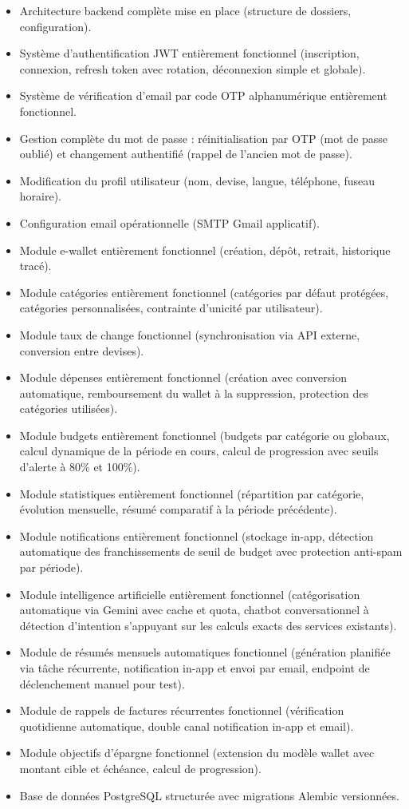 \documentclass[11pt,a4paper]{article}
\begin{document}
\begin{itemize}[leftmargin=*]
    \item Architecture backend complète mise en place (structure de dossiers, configuration).
    \item Système d'authentification JWT entièrement fonctionnel (inscription, connexion, refresh token avec rotation, déconnexion simple et globale).
    \item Système de vérification d'email par code OTP alphanumérique entièrement fonctionnel.
    \item Gestion complète du mot de passe : réinitialisation par OTP (mot de passe oublié) et changement authentifié (rappel de l'ancien mot de passe).
    \item Modification du profil utilisateur (nom, devise, langue, téléphone, fuseau horaire).
    \item Configuration email opérationnelle (SMTP Gmail applicatif).
    \item Module e-wallet entièrement fonctionnel (création, dépôt, retrait, historique tracé).
    \item Module catégories entièrement fonctionnel (catégories par défaut protégées, catégories personnalisées, contrainte d'unicité par utilisateur).
    \item Module taux de change fonctionnel (synchronisation via API externe, conversion entre devises).
    \item Module dépenses entièrement fonctionnel (création avec conversion automatique, remboursement du wallet à la suppression, protection des catégories utilisées).
    \item Module budgets entièrement fonctionnel (budgets par catégorie ou globaux, calcul dynamique de la période en cours, calcul de progression avec seuils d'alerte à 80\% et 100\%).
    \item Module statistiques entièrement fonctionnel (répartition par catégorie, évolution mensuelle, résumé comparatif à la période précédente).
    \item Module notifications entièrement fonctionnel (stockage in-app, détection automatique des franchissements de seuil de budget avec protection anti-spam par période).
    \item Module intelligence artificielle entièrement fonctionnel (catégorisation automatique via Gemini avec cache et quota, chatbot conversationnel à détection d'intention s'appuyant sur les calculs exacts des services existants).
    \item Module de résumés mensuels automatiques fonctionnel (génération planifiée via tâche récurrente, notification in-app et envoi par email, endpoint de déclenchement manuel pour test).
    \item Module de rappels de factures récurrentes fonctionnel (vérification quotidienne automatique, double canal notification in-app et email).
    \item Module objectifs d'épargne fonctionnel (extension du modèle wallet avec montant cible et échéance, calcul de progression).
    \item Base de données PostgreSQL structurée avec migrations Alembic versionnées.
\end{itemize}
\end{document}
